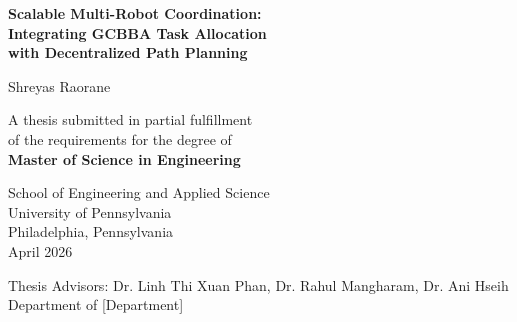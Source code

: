 \begin{titlepage}
  \centering
  \vspace*{1in}

  {\LARGE\bfseries
    Scalable Multi-Robot Coordination: \\[0.3em]
    Integrating GCBBA Task Allocation \\[0.3em]
    with Decentralized Path Planning
  \par}

  \vspace{1.5in}

  {\large Shreyas Raorane}

  \vspace{0.5in}

  {\normalsize
    A thesis submitted in partial fulfillment \\
    of the requirements for the degree of \\[0.5em]
    \textbf{Master of Science in Engineering}
  \par}

  \vspace{0.5in}

  {\normalsize
    School of Engineering and Applied Science \\
    University of Pennsylvania \\[0.5em]
    Philadelphia, Pennsylvania \\[0.5em]
    April 2026
  \par}

  \vspace{1in}

  {\normalsize
    Thesis Advisors: Dr. Linh Thi Xuan Phan, Dr. Rahul Mangharam, Dr. Ani Hseih  \\
    Department of [Department]
  \par}

\end{titlepage}
